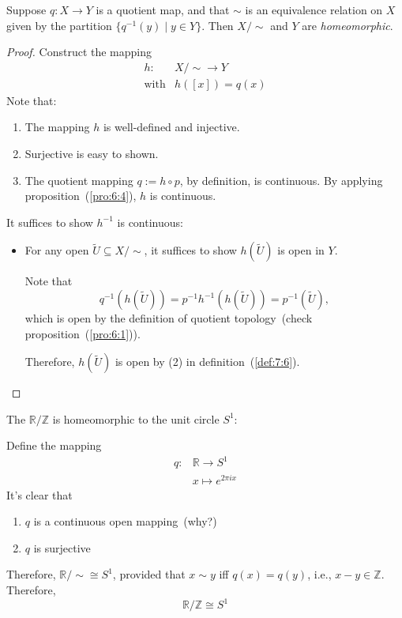 \begin{proposition}
Suppose $q:X\to Y$ is a quotient map, and that $\sim$ is an equivalence relation on $X$ given by the partition $\{q^{-1}(y)\mid y\in Y\}$.
Then $X/\sim$ and $Y$ are \emph{homeomorphic}.
\end{proposition}
\begin{proof}
Construct the mapping 
\[
\begin{array}{ll}
h:&X/\sim\to Y\\
\text{with}&h([x]) = q(x)
\end{array}
\]
Note that:
\begin{enumerate}
\item
The mapping $h$ is well-defined and injective.
\item
Surjective is easy to shown.
\item
The quotient mapping $q:=h\circ p$, by definition, is continuous.
By applying proposition~(\ref{pro:6:4}), $h$ is continuous.
\end{enumerate}
It suffices to show $h^{-1}$ is continuous:
\begin{itemize}
\item
For any open $\tilde{U}\subseteq X/\sim$, it suffices to show $h(\tilde{U})$ is open in $Y$.

Note that
\[
q^{-1}(h(\tilde{U}))=p^{-1}h^{-1}(h(\tilde{U}))=p^{-1}(\tilde{U}),
\]
which is open by the definition of quotient topology~(check proposition~(\ref{pro:6:1})).

Therefore, $h(\tilde U)$ is open by (2) in definition~(\ref{def:7:6}).
\end{itemize}
\end{proof}

\begin{example}
The $\mathbb{R}/\mathbb{Z}$ is homeomorphic to the unit circle $S^1$:

Define the mapping
\[
\begin{array}{ll}
q:&\mathbb{R}\to S^1\\
&x\mapsto e^{2\pi i x}
\end{array}
\]
It's clear that
\begin{enumerate}
\item
$q$ is a continuous open mapping~(why?)
\item
$q$ is surjective
\end{enumerate}
Therefore, $\mathbb{R}/\sim\cong S^1$, provided that $x\sim y$ iff $q(x)=q(y)$, i.e., $x-y\in\mathbb{Z}$.
Therefore, 
\[
\mathbb{R}/\mathbb{Z}\cong S^1
\]
\end{example}


